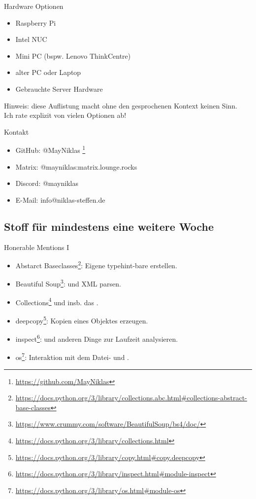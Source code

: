 \documentclass[12pt, aspectratio=169, usepdftitle=false]{beamer}
\newcommand{\furl}[1]{\footnote{\url{#1}}}
\begin{document}
\begin{frame}[fragile]{Hardware Optionen}
	\begin{itemize}
		\item \pause Raspberry Pi
		\item \pause Intel NUC
		\item \pause Mini PC (bspw. Lenovo ThinkCentre)
		\item \pause alter PC oder Laptop
		\item \pause Gebrauchte Server Hardware
	\end{itemize}
	Hinweis: diese Auflistung macht ohne den gesprochenen Kontext keinen Sinn.\\
	Ich rate explizit von vielen Optionen ab!
\end{frame}

\begin{frame}[fragile]{Kontakt}
	\begin{itemize}
		\item GitHub: @MayNiklas \furl{https://github.com/MayNiklas}
		\item Matrix: @mayniklas:matrix.lounge.rocks
		\item Discord: @mayniklas
		\item E-Mail: info@niklas-steffen.de
	\end{itemize}
\end{frame}


\framecardfragen

\subsection{Stoff für mindestens eine weitere Woche}


\begin{frame}[fragile]{Honerable Mentions I}
	\begin{itemize}
		\item Abstarct Baseclasses\furl{https://docs.python.org/3/library/collections.abc.html\#collections-abstract-base-classes}: Eigene typehint-bare  erstellen.
		
		\item Beautiful Soup\furl{https://www.crummy.com/software/BeautifulSoup/bs4/doc/}:  und XML parsen.
		
		\item Collections\furl{https://docs.python.org/3/library/collections.html} und insb. das .
		
		\item deepcopy\furl{https://docs.python.org/3/library/copy.html\#copy.deepcopy}:  Kopien eines Objektes erzeugen.
		
		\item inspect\furl{https://docs.python.org/3/library/inspect.html\#module-inspect}:  und anderen Dinge zur Laufzeit analysieren.
		
		\item os\furl{https://docs.python.org/3/library/os.html\#module-os}: Interaktion mit dem Datei- und .
		
	\end{itemize}
\end{frame}
\end{document}
